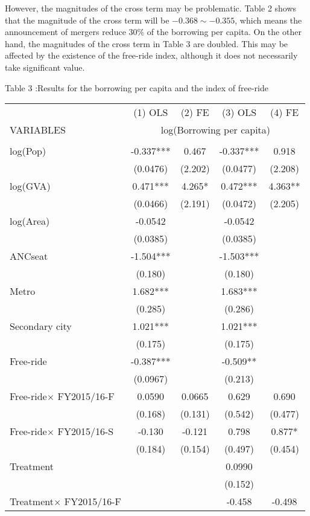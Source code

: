 \documentclass[dvipdfmx]{jsarticle}
\begin{document}
\quad However, the magnitudes of the cross term may be problematic. Table 2 shows that the magnitude of the cross term will be $-0.368 \sim -0.355$, which means the announcement of mergers reduce 30\% of the borrowing per capita. On the other hand, the magnitudes of the cross term in Table 3 are doubled. This may be affected by the existence of the free-ride index, although it does not necessarily take significant value.\\  
\begin{center}
Table 3 :Results for the borrowing per capita and the index of free-ride\\
\scriptsize
\begin{tabular}{lcccc} \hline
 & (1) OLS& (2) FE& (3) OLS& (4) FE\\
VARIABLES & \multicolumn{4}{c}{ log(Borrowing per capita)}\\ \hline
 &  &  &  &  \\
log(Pop) & -0.337*** & 0.467 & -0.337*** & 0.918 \\
 & (0.0476) & (2.202) & (0.0477) & (2.208) \\
log(GVA) & 0.471*** & 4.265* & 0.472*** & 4.363** \\
 & (0.0466) & (2.191) & (0.0472) & (2.205) \\
log(Area) & -0.0542 &  & -0.0542 &  \\
 & (0.0385) &  & (0.0385) &  \\
ANCseat & -1.504*** &  & -1.503*** &  \\
 & (0.180) &  & (0.180) &  \\
Metro & 1.682*** &  & 1.683*** &  \\
 & (0.285) &  & (0.286) &  \\
Secondary city & 1.021*** &  & 1.021*** &  \\
 & (0.175) &  & (0.175) &  \\
Free-ride & -0.387*** &  & -0.509** &  \\
 & (0.0967) &  & (0.213) &  \\
Free-ride$\times$ FY2015/16-F & 0.0590 & 0.0665 & 0.629 & 0.690 \\
 & (0.168) & (0.131) & (0.542) & (0.477) \\
Free-ride$\times$ FY2015/16-S & -0.130 & -0.121 & 0.798 & 0.877* \\
 & (0.184) & (0.154) & (0.497) & (0.454) \\
Treatment &  &  & 0.0990 &  \\
 &  &  & (0.152) &  \\
Treatment$\times$ FY2015/16-F &  &  & -0.458 & -0.498 \\

\end{tabular}
\end{center}
\end{document}
